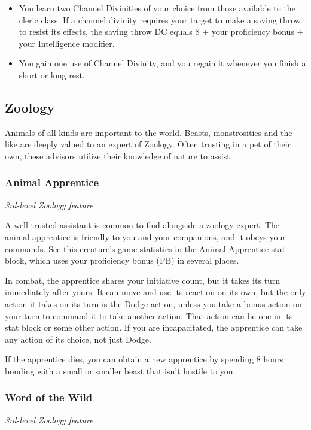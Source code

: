 \documentclass[letterpaper,openany,twoside,twocolumn]{book}
\begin{document}
	\begin{itemize}
		\item You learn two Channel Divinities of your choice from those available to the cleric class. If a channel divinity requires your target to make a saving throw to resist its effects, the saving throw DC equals 8 + your proficiency bonus + your Intelligence modifier.
		\item You gain one use of Channel Divinity, and you regain it whenever you finish a short or long rest.
	\end{itemize}
	
	\subsection*{Zoology}
	Animals of all kinds are important to the world. Beasts, monstrosities and the like are deeply valued to an expert of Zoology. Often trusting in a pet of their own, these advisors utilize their knowledge of nature to assist.
	
	\subsubsection*{Animal Apprentice}
	\textnormal{\textit{3rd-level Zoology feature}}
	
	A well trusted assistant is common to find alongside a zoology expert. The animal apprentice is friendly to you and your companions, and it obeys your commands. See this creature’s game statistics in the Animal Apprentice stat block, which uses your proficiency bonus (PB) in several places.
	
	In combat, the apprentice shares your initiative count, but it takes its turn immediately after yours. It can move and use its reaction on its own, but the only action it takes on its turn is the Dodge action, unless you take a bonus action on your turn to command it to take another action. That action can be one in its stat block or some other action. If you are incapacitated, the apprentice can take any action of its choice, not just Dodge.
	
	If the apprentice dies, you can obtain a new apprentice by spending 8 hours bonding with a small or smaller beast that isn’t hostile to you.
	
	\subsubsection*{Word of the Wild}
	\textnormal{\textit{3rd-level Zoology feature}}
	
\end{document}
